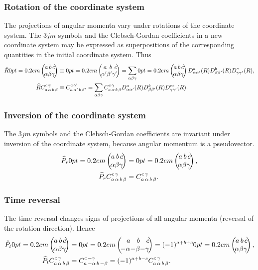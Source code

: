 \subsubsection{Rotation of the coordinate system}

The projections of angular momenta vary under rotations of the coordinate system. The $3 j m$ symbols and the Clebsch-Gordan coefficients in a new coordinate system may be expressed as superpositions of the corresponding quantities in the initial coordinate system. Thus
\begin{align}
\hat{R}\threej{a}{b}{c}{\alpha}{\beta}{\gamma} & \equiv\threej{a}{b}{c}{\alpha^{\prime}}{\beta^{\prime}}{\gamma^{\prime}}=\sum_{\alpha \beta \gamma}\threej{a}{b}{c}{\alpha}{\beta}{\gamma} D_{\alpha \alpha^{\prime}}^{a}(R) D_{\beta \beta^{\prime}}^{b}(R) D_{\gamma \gamma^{\prime}}^{c}(R), \label{eq:8:4:22}\\
\widehat{R} \clebsch{a}{\alpha}{b}{\beta}{c}{\gamma} & \equiv \clebsch{a}{\alpha^{\prime}}{b}{\beta^{\prime}}{c}{\gamma^{\prime}}=\sum_{\alpha \beta \gamma} \clebsch{a}{\alpha}{b}{\beta}{c}{\gamma} D_{\alpha \alpha^{\prime}}^{a}(R) D_{\beta \beta^{\prime}}^{b}(R) D_{\gamma \gamma^{\prime}}^{c *}(R). \notag
\end{align}
\subsubsection{Inversion of the coordinate system}

The $3 j m$ symbols and the Clebsch-Gordan coefficients are invariant under inversion of the coordinate system, because angular momentum is a pseudovector.
\begin{align}
\widehat{P}_{r}\threej{a}{b}{c}{\alpha}{\beta}{\gamma} & =\threej{a}{b}{c}{\alpha}{\beta}{\gamma}, \label{eq:8:4:23}\\
\widehat{P}_{r} \clebsch{a}{\alpha}{b}{\beta}{c}{\gamma} & =\clebsch{a}{\alpha}{b}{\beta}{c}{\gamma}. \notag
\end{align}
\subsubsection{Time reversal}
The time reversal changes signs of projections of all angular momenta (reversal of the rotation direction). Hence
\begin{align}
\hat{P}_{t}\threej{a}{b}{c}{\alpha}{\beta}{\gamma} & =\threej{a}{b}{c}{-\alpha}{-\beta}{-\gamma}=(-1)^{a+b+c}\threej{a}{b}{c}{\alpha}{\beta}{\gamma}, \label{eq:8:4:24}\\
\widehat{P}_{t} \clebsch{a}{\alpha}{b}{\beta}{c}{\gamma} & =\clebsch{a}{-\alpha}{b}{-\beta}{c}{-\gamma}=(-1)^{a+b-c} \clebsch{a}{\alpha}{b}{\beta}{c}{\gamma}. \notag
\end{align}
